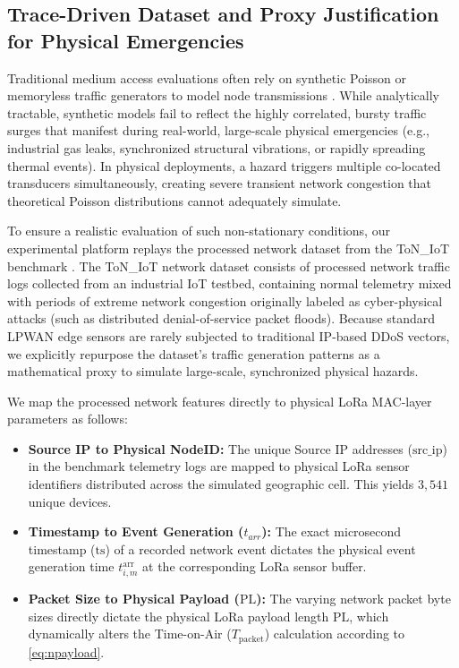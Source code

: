 \documentclass[preprint,review,12pt]{elsarticle}
\begin{document}
\subsection{Trace-Driven Dataset and Proxy Justification for Physical Emergencies}
\label{sec:dataset_justification}

Traditional medium access evaluations often rely on synthetic Poisson or memoryless traffic generators to model node transmissions \cite{adelantado2017understanding}. While analytically tractable, synthetic models fail to reflect the highly correlated, bursty traffic surges that manifest during real-world, large-scale physical emergencies (e.g., industrial gas leaks, synchronized structural vibrations, or rapidly spreading thermal events). In physical deployments, a hazard triggers multiple co-located transducers simultaneously, creating severe transient network congestion that theoretical Poisson distributions cannot adequately simulate.

To ensure a realistic evaluation of such non-stationary conditions, our experimental platform replays the processed network dataset from the ToN\_IoT benchmark \cite{alhawawreh2020toniot}. The ToN\_IoT network dataset consists of processed network traffic logs collected from an industrial IoT testbed, containing normal telemetry mixed with periods of extreme network congestion originally labeled as cyber-physical attacks (such as distributed denial-of-service packet floods). Because standard LPWAN edge sensors are rarely subjected to traditional IP-based DDoS vectors, we explicitly repurpose the dataset's traffic generation patterns as a mathematical proxy to simulate large-scale, synchronized physical hazards. 

We map the processed network features directly to physical LoRa MAC-layer parameters as follows:

\begin{itemize}

    \item \textbf{Source IP to Physical NodeID:} The unique Source IP addresses ($\text{src\_ip}$) in the benchmark telemetry logs are mapped to physical LoRa sensor identifiers distributed across the simulated geographic cell. This yields $3,541$ unique devices.

    \item \textbf{Timestamp to Event Generation ($t_{arr}$):} The exact microsecond timestamp ($\text{ts}$) of a recorded network event dictates the physical event generation time $t_{i,m}^{\text{arr}}$ at the corresponding LoRa sensor buffer.

    \item \textbf{Packet Size to Physical Payload ($\text{PL}$):} The varying network packet byte sizes directly dictate the physical LoRa payload length $\text{PL}$, which dynamically alters the Time-on-Air ($T_{\text{packet}}$) calculation according to \eqref{eq:npayload}.

\end{itemize}
\end{document}
